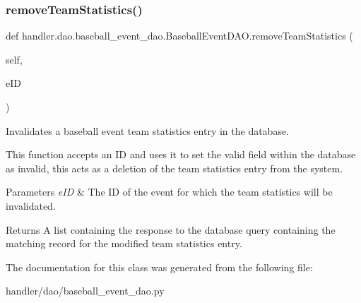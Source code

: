 \subsubsection{\texorpdfstring{remove\+Team\+Statistics()}{removeTeamStatistics()}}
{\footnotesize\ttfamily def handler.\+dao.\+baseball\+\_\+event\+\_\+dao.\+Baseball\+Event\+D\+A\+O.\+remove\+Team\+Statistics (\begin{DoxyParamCaption}\item[{}]{self,  }\item[{}]{e\+ID }\end{DoxyParamCaption})}



Invalidates a baseball event team statistics entry in the database. 

This function accepts an ID and uses it to set the valid field within the database as invalid, this acts as a deletion of the team statistics entry from the system.


\begin{DoxyParams}{Parameters}
{\em e\+ID} & The ID of the event for which the team statistics will be invalidated.\\
\hline
\end{DoxyParams}
\begin{DoxyReturn}{Returns}
A list containing the response to the database query containing the matching record for the modified team statistics entry. 
\end{DoxyReturn}


The documentation for this class was generated from the following file\+:\begin{DoxyCompactItemize}
\item 
handler/dao/baseball\+\_\+event\+\_\+dao.\+py\end{DoxyCompactItemize}
